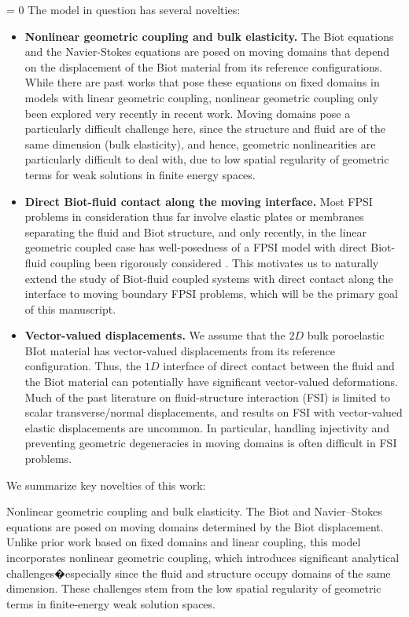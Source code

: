 \documentclass[11pt]{article}
\theoremstyle{definition}
\begin{document}
 = 0
The model in question has several novelties:
\begin{itemize}
\item \textbf{Nonlinear geometric coupling and bulk elasticity.} The Biot equations and the Navier-Stokes equations are posed on moving domains that depend on the displacement of the Biot material from its reference configurations. While there are past works that pose these equations on fixed domains in models with linear geometric coupling, nonlinear geometric coupling only been explored very recently in recent work. Moving domains pose a particularly difficult challenge here, since the structure and fluid are of the same dimension (bulk elasticity), and hence, geometric nonlinearities are particularly difficult to deal with, due to low spatial regularity of geometric terms for weak solutions in finite energy spaces.
\item \textbf{Direct Biot-fluid contact along the moving interface.} Most FPSI problems in consideration thus far involve elastic plates or membranes separating the fluid and Biot structure, and only recently, in the linear geometric coupled case has well-posedness of a FPSI model with direct Biot-fluid coupling been rigorously considered \cite{Gurvich}. This motivates us to naturally extend the study of Biot-fluid coupled systems with direct contact along the interface to moving boundary FPSI problems, which will be the primary goal of this manuscript.
\item \textbf{Vector-valued displacements.} We assume that the $2D$ bulk poroelastic BIot material has vector-valued displacements from its reference configuration. Thus, the $1D$ interface of direct contact between the fluid and the Biot material can potentially have significant vector-valued deformations. Much of the past literature on fluid-structure interaction (FSI) is limited to scalar transverse/normal displacements, and results on FSI with vector-valued elastic displacements are uncommon. In particular, handling injectivity and preventing geometric degeneracies in moving domains is often difficult in FSI problems.
\end{itemize}

We summarize key novelties of this work:

    Nonlinear geometric coupling and bulk elasticity. The Biot and Navier--Stokes equations are posed on moving domains determined by the Biot displacement. Unlike prior work based on fixed domains and linear coupling, this model incorporates nonlinear geometric coupling, which introduces significant analytical challenges�especially since the fluid and structure occupy domains of the same dimension. These challenges stem from the low spatial regularity of geometric terms in finite-energy weak solution spaces.
\end{document}
